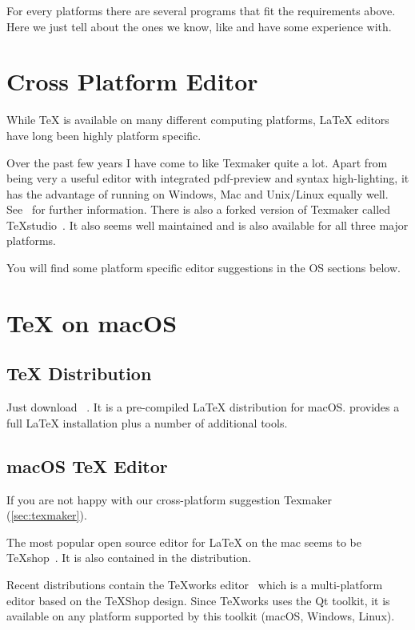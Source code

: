 For every platforms there are several programs that fit the requirements above.
Here we just tell about the ones we know, like and have some experience
with.

\section{Cross Platform Editor}\label{sec:texmaker}

While \TeX{} is available on many different computing platforms, \LaTeX{}
editors have long been highly platform specific.

Over the past few years I have come to like Texmaker quite a lot.
Apart from being very a useful editor with integrated pdf-preview and syntax
high-lighting, it has the advantage of running on Windows, Mac and
Unix/Linux equally well.  See~\cite{texmaker} for
further information.  There is also a forked version of Texmaker called
TeXstudio~\cite{texstudio}.  It also seems well
maintained and is also available for all three major platforms.

You will find some platform specific editor suggestions in the OS sections
below.

\section{\TeX{} on macOS}

\subsection{\TeX{} Distribution}

Just download ~\cite{mactex}. It is a
pre-compiled \LaTeX{} distribution for macOS\@.  provides a full \LaTeX{}
installation plus a number of additional tools.

\subsection{macOS \TeX{} Editor}

If you are not happy with our cross-platform suggestion Texmaker (\autoref{sec:texmaker}).

The most popular open source editor for \LaTeX{} on the mac seems to be
\TeX{}shop~\cite{texshop}. It
is also contained in the  distribution.

Recent \TeXLive{} distributions contain the \TeX{}works editor~\cite{texworks}
which is a multi-platform editor based on the \TeX{}Shop
design. Since \TeX{}works uses the Qt toolkit, it is available on any platform
supported by this toolkit (macOS, Windows, Linux).

